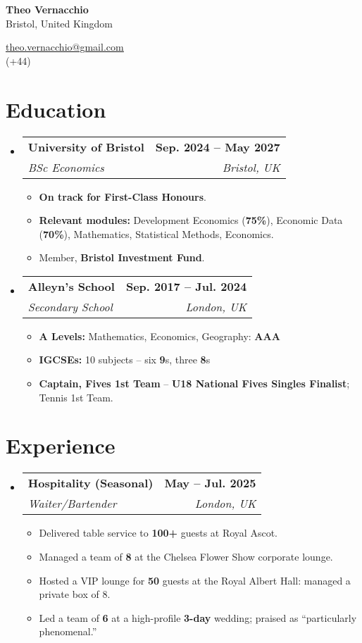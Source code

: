\documentclass[a4paper,11pt]{article}
\makeatletter
\newcommand{\resumeItem}[1]{\item\small{#1 \vspace{-1pt}}}
\newcommand{\resumeSubheading}[4]{
  \vspace{-2pt}\item
  \begin{tabular*}{1.0\textwidth}[t]{l@{\extracolsep{\fill}}r}
    \textbf{#1} & \textbf{\small #2} \\
    \textit{\small #3} & \textit{\small #4} \\
  \end{tabular*}\vspace{-7pt}
}
\newcommand{\resumeSubHeadingListStart}{\begin{itemize}[leftmargin=0.0in, label={}]}
\newcommand{\resumeSubHeadingListEnd}{\end{itemize}}
\newcommand{\resumeItemListStart}{\begin{itemize}[leftmargin=0.15in, itemsep=4pt, topsep=2pt]}
\newcommand{\resumeItemListEnd}{\end{itemize}\vspace{-2pt}}
\makeatother
\begin{document}
\begin{flushleft}
  \begin{minipage}[t]{0.60\textwidth}
    {\Huge\bfseries Theo Vernacchio}\\[-1pt]
    \normalsize Bristol, United Kingdom
  \end{minipage}%
  \hfill
  \begin{minipage}[t]{0.35\textwidth}
    \raggedleft
    \href{mailto:theo.vernacchio@gmail.com}{\underline{theo.vernacchio@gmail.com}}\\[-1pt]
    (+44)
  \end{minipage}
\end{flushleft}

\vspace{0.55\baselineskip}

\section{Education}
  \resumeSubHeadingListStart
    \resumeSubheading
      {University of Bristol}{Sep. 2024 -- May 2027}
      {BSc Economics}{Bristol, UK}
      \resumeItemListStart
        \resumeItem{\textbf{On track for First-Class Honours}.}
        \resumeItem{\textbf{Relevant modules:} Development Economics (\textbf{75\%}), Economic Data (\textbf{70\%}), Mathematics, Statistical Methods, Economics.}
        \resumeItem{Member, \textbf{Bristol Investment Fund}.}
      \resumeItemListEnd
    \resumeSubheading
      {Alleyn's School}{Sep. 2017 -- Jul. 2024}
      {Secondary School}{London, UK}
      \resumeItemListStart
        \resumeItem{\textbf{A Levels:} Mathematics, Economics, Geography: \textbf{AAA}}
        \resumeItem{\textbf{IGCSEs:} 10 subjects -- six \textbf{9}s, three \textbf{8}s}
        \resumeItem{\textbf{Captain, Fives 1st Team} -- \textbf{U18 National Fives Singles Finalist}; Tennis 1st Team.}
      \resumeItemListEnd
  \resumeSubHeadingListEnd

\section{Experience}
  \resumeSubHeadingListStart
    \resumeSubheading
      {Hospitality (Seasonal)}{May -- Jul. 2025}
      {Waiter/Bartender}{London, UK}
      \resumeItemListStart
        \resumeItem{Delivered table service to \textbf{100+} guests at Royal Ascot.}
        \resumeItem{Managed a team of \textbf{8} at the Chelsea Flower Show corporate lounge.}
        \resumeItem{Hosted a VIP lounge for \textbf{50} guests at the Royal Albert Hall: managed a private box of 8.}
        \resumeItem{Led a team of \textbf{6} at a high-profile \textbf{3-day} wedding; praised as ``particularly phenomenal.''}
      \resumeItemListEnd
  \resumeSubHeadingListEnd
\end{document}
